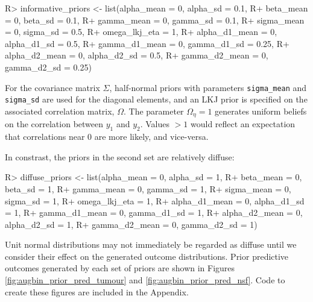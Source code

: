 \documentclass[article]{jss}
\begin{document}
\begin{CodeChunk}

\begin{CodeInput}
R> informative_priors <- list(alpha_mean = 0, alpha_sd = 0.1,
R+                            beta_mean = 0, beta_sd = 0.1,
R+                            gamma_mean = 0, gamma_sd = 0.1,
R+                            sigma_mean = 0, sigma_sd = 0.5,
R+                            omega_lkj_eta = 1,
R+                            alpha_d1_mean = 0, alpha_d1_sd = 0.5,
R+                            gamma_d1_mean = 0, gamma_d1_sd = 0.25,
R+                            alpha_d2_mean = 0, alpha_d2_sd = 0.5,
R+                            gamma_d2_mean = 0, gamma_d2_sd = 0.25)
\end{CodeInput}
\end{CodeChunk}

For the covariance matrix \(\Sigma\), half-normal priors with parameters
\texttt{sigma\_mean} and \texttt{sigma\_sd} are used for the diagonal
elements, and an LKJ prior is specified on the associated correlation
matrix, \(\Omega\). The parameter \(\Omega_\eta = 1\) generates uniform
beliefs on the correlation between \(y_1\) and \(y_2\). Values \(> 1\)
would reflect an expectation that correlations near 0 are more likely,
and vice-versa.

In constrast, the priors in the second set are relatively diffuse:

\begin{CodeChunk}

\begin{CodeInput}
R> diffuse_priors <- list(alpha_mean = 0, alpha_sd = 1,
R+                        beta_mean = 0, beta_sd = 1,
R+                        gamma_mean = 0, gamma_sd = 1,
R+                        sigma_mean = 0, sigma_sd = 1,
R+                        omega_lkj_eta = 1,
R+                        alpha_d1_mean = 0, alpha_d1_sd = 1,
R+                        gamma_d1_mean = 0, gamma_d1_sd = 1,
R+                        alpha_d2_mean = 0, alpha_d2_sd = 1,
R+                        gamma_d2_mean = 0, gamma_d2_sd = 1)
\end{CodeInput}
\end{CodeChunk}

Unit normal distributions may not immediately be regarded as diffuse
until we consider their effect on the generated outcome distributions.
Prior predictive outcomes generated by each set of priors are shown in
Figures \ref{fig:augbin_prior_pred_tumour} and
\ref{fig:augbin_prior_pred_nsf}. Code to create these figures are
included in the Appendix.
\end{document}
